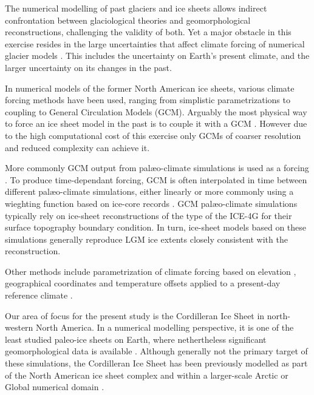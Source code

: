 
\introduction
\label{sec:intro}

The numerical modelling of past glaciers and ice sheets allows indirect confrontation between glaciological theories and geomorphological reconstructions, challenging the validity of both. Yet a major obstacle in this exercise resides in the large uncertainties that affect climate forcing of numerical glacier models \citep{hebeler-etal-2008}. This includes the uncertainty on Earth's present climate, and the larger uncertainty on its changes in the past.

In numerical models of the former North American ice sheets, various climate forcing methods have been used, ranging from simplistic parametrizations to coupling to General Circulation Models (GCM). Arguably the most physical way to force an ice sheet model in the past is to couple it with a GCM \citep{yoshimori-etal-2001,calov-etal-2002,abeouchi-etal-2007,charbit-etal-2013}. However due to the high computational cost of this exercise only GCMs of coarser resolution and reduced complexity can achieve it.

More commonly GCM output from palæo-climate simulations is used as a forcing \citep{huybrechts-tsiobbel-1996}. To produce time-dependant forcing, GCM is often interpolated in time between different palæo-climate simulations, either linearly \citep{charbit-etal-2002} or more commonly using a wieghting function based on ice-core records \citep{marshall-clarke-1999,tarasov-peltier-2004,zweck-huybrechts-2005,gregoire-etal-2012}. GCM palæo-climate simulations typically rely on ice-sheet reconstructions of the type of the ICE-4G \citep{peltier-1994} for their surface topography boundary condition. In turn, ice-sheet models based on these simulations generally reproduce LGM ice extents closely consistent with the reconstruction.

Other methods include parametrization of climate forcing based on elevation \citep{robert-1991}, geographical coordinates \citep{fastook-prentice-1994,johnson-fastook-2002} and temperature offsets applied to a present-day reference climate \citep{bintanja-etal-2005}.


Our area of focus for the present study is the Cordilleran Ice Sheet in north-western North America. In a numerical modelling perspective, it is one of the least studied paleo-ice sheets on Earth, where nethertheless significant geomorphological data is available \citep{jackson-clague-1991}. Although generally not the primary target of these simulations, the Cordilleran Ice Sheet has been previously modelled as part of the North American ice sheet complex \citep{marshall-clarke-1999,calov-etal-2002,tarasov-peltier-2004,bintanja-etal-2005,gregoire-etal-2012} and within a larger-scale Arctic or Global numerical domain \citep{huybrechts-tsiobbel-1996,charbit-etal-2002,johnson-fastook-2002,zweck-huybrechts-2005,abeouchi-etal-2007,charbit-etal-2013}.

